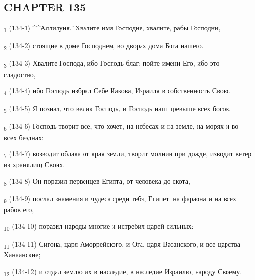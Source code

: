 \subsection{CHAPTER 135}
\begin{tcolorbox}
\textsubscript{1} (134-1) ^^Аллилуия.^^ Хвалите имя Господне, хвалите, рабы Господни,
\end{tcolorbox}
\begin{tcolorbox}
\textsubscript{2} (134-2) стоящие в доме Господнем, во дворах дома Бога нашего.
\end{tcolorbox}
\begin{tcolorbox}
\textsubscript{3} (134-3) Хвалите Господа, ибо Господь благ; пойте имени Его, ибо это сладостно,
\end{tcolorbox}
\begin{tcolorbox}
\textsubscript{4} (134-4) ибо Господь избрал Себе Иакова, Израиля в собственность Свою.
\end{tcolorbox}
\begin{tcolorbox}
\textsubscript{5} (134-5) Я познал, что велик Господь, и Господь наш превыше всех богов.
\end{tcolorbox}
\begin{tcolorbox}
\textsubscript{6} (134-6) Господь творит все, что хочет, на небесах и на земле, на морях и во всех безднах;
\end{tcolorbox}
\begin{tcolorbox}
\textsubscript{7} (134-7) возводит облака от края земли, творит молнии при дожде, изводит ветер из хранилищ Своих.
\end{tcolorbox}
\begin{tcolorbox}
\textsubscript{8} (134-8) Он поразил первенцев Египта, от человека до скота,
\end{tcolorbox}
\begin{tcolorbox}
\textsubscript{9} (134-9) послал знамения и чудеса среди тебя, Египет, на фараона и на всех рабов его,
\end{tcolorbox}
\begin{tcolorbox}
\textsubscript{10} (134-10) поразил народы многие и истребил царей сильных:
\end{tcolorbox}
\begin{tcolorbox}
\textsubscript{11} (134-11) Сигона, царя Аморрейского, и Ога, царя Васанского, и все царства Ханаанские;
\end{tcolorbox}
\begin{tcolorbox}
\textsubscript{12} (134-12) и отдал землю их в наследие, в наследие Израилю, народу Своему.
\end{tcolorbox}
